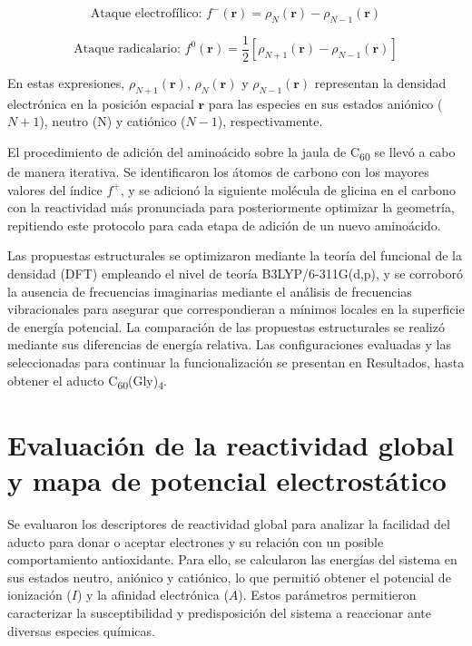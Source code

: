 \begin{equation}
    \text{Ataque electrofílico: } f^-(\mathbf{r}) = \rho_N(\mathbf{r}) - \rho_{N-1}(\mathbf{r})
\end{equation}

\begin{equation}
    \text{Ataque radicalario: } f^0(\mathbf{r}) = \frac{1}{2} \left[ \rho_{N+1}(\mathbf{r}) - \rho_{N-1}(\mathbf{r}) \right]
\end{equation}

En estas expresiones, $\rho_{N+1}(\mathbf{r})$, $\rho_N(\mathbf{r})$ y $\rho_{N-1}(\mathbf{r})$ representan la densidad electrónica en la posición espacial $\mathbf{r}$ para las especies en sus estados aniónico ($N+1$), neutro (N) y catiónico ($N-1$), respectivamente. 

El procedimiento de adición del aminoácido sobre la jaula de C\textsubscript{60} se llevó a cabo de manera iterativa. Se identificaron los átomos de carbono con los mayores valores del índice $f^+$, y se adicionó la siguiente molécula de glicina en el carbono con la reactividad más pronunciada para posteriormente optimizar la geometría, repitiendo este protocolo para cada etapa de adición de un nuevo aminoácido.

Las propuestas estructurales se optimizaron mediante la teoría del funcional de la densidad (DFT) empleando el nivel de teoría B3LYP/6-311G(d,p), y se corroboró la ausencia de frecuencias imaginarias mediante el análisis de frecuencias vibracionales para asegurar que correspondieran a mínimos locales en la superficie de energía potencial. La comparación de las propuestas estructurales se realizó mediante sus diferencias de energía relativa. Las configuraciones evaluadas y las seleccionadas para continuar la funcionalización se presentan en Resultados, hasta obtener el aducto C\textsubscript{60}(Gly)\textsubscript{4}.
\section{Evaluación de la reactividad global y mapa de potencial electrostático}
Se evaluaron los descriptores de reactividad global para analizar la facilidad del aducto para donar o aceptar electrones y su relación con un posible comportamiento antioxidante. Para ello, se calcularon las energías del sistema en sus estados neutro, aniónico y catiónico, lo que permitió obtener el potencial de ionización ($I$) y la afinidad electrónica ($A$). Estos parámetros permitieron caracterizar la susceptibilidad y predisposición del sistema a reaccionar ante diversas especies químicas.

